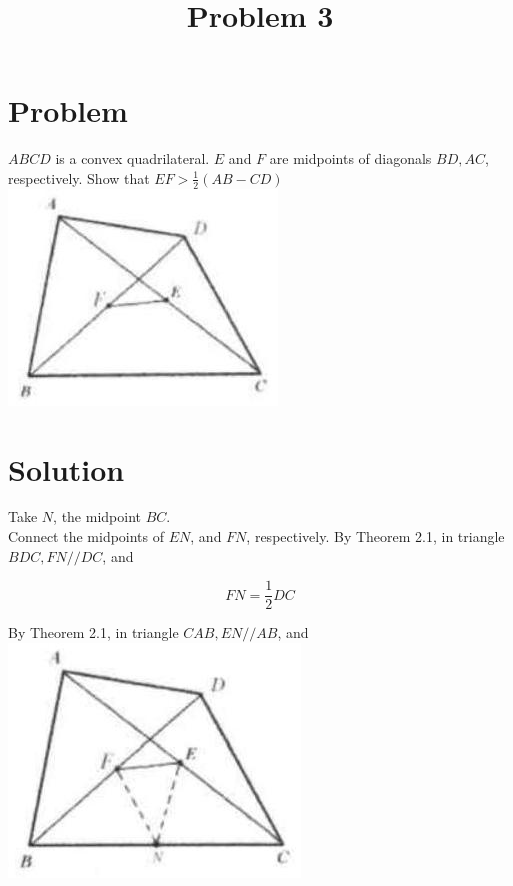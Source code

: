 \documentclass{article}
\title{Problem 3}
\date{}
\begin{document}
\maketitle

\section*{Problem}
\(A B C D\) is a convex quadrilateral. \(E\) and \(F\) are midpoints of diagonals \(B D, A C\), respectively. Show that \(E F>\frac{1}{2}(A B-C D)\)\\
\centering
\includegraphics[width=\textwidth]{images/problem_image_1.jpg}

\section*{Solution}
Take \(N\), the midpoint \(B C\).\\
Connect the midpoints of \(E N\), and \(F N\), respectively. By Theorem 2.1, in triangle \(B D C, F N / / D C\), and

\[
F N=\frac{1}{2} D C
\]

By Theorem 2.1, in triangle \(C A B, E N / / A B\), and\\
\centering
\includegraphics[width=\textwidth]{images/reasoning_image_1.jpg}
\end{document}
